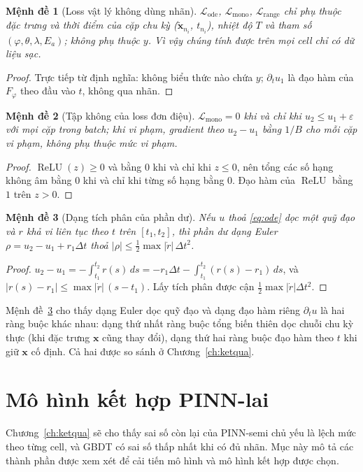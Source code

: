 \documentclass[12pt,a4paper,oneside]{report}
\theoremstyle{plain}
\newtheorem{menhde}{Mệnh đề}[chapter]
\theoremstyle{definition}
\begin{document}
\begin{menhde}[Loss vật lý không dùng nhãn]\label{md:labelfree}
$\mathcal{L}_\text{ode}$, $\mathcal{L}_\text{mono}$, $\mathcal{L}_\text{range}$ chỉ phụ thuộc đặc trưng và thời
điểm của cặp chu kỳ ($\tilde{\mathbf{x}}_{n_i}$, $t_{n_i}$), nhiệt độ $T$ và tham số
$(\varphi, \theta, \lambda, E_a)$; không phụ thuộc $y$. Vì vậy chúng tính được trên mọi cell chỉ có dữ liệu sạc.
\end{menhde}
\begin{proof}
Trực tiếp từ định nghĩa: không biểu thức nào chứa $y$; $\partial_t u_1$ là đạo hàm của $F_\varphi$ theo đầu vào
$t$, không qua nhãn.
\end{proof}

\begin{menhde}[Tập không của loss đơn điệu]\label{md:mono}
$\mathcal{L}_\text{mono} = 0$ khi và chỉ khi $u_2 \le u_1 + \varepsilon$ với mọi cặp trong batch; khi vi phạm,
gradient theo $u_2 - u_1$ bằng $1/B$ cho mỗi cặp vi phạm, không phụ thuộc mức vi phạm.
\end{menhde}
\begin{proof}
$\operatorname{ReLU}(z) \ge 0$ và bằng $0$ khi và chỉ khi $z \le 0$, nên tổng các số hạng không âm bằng $0$ khi
và chỉ khi từng số hạng bằng $0$. Đạo hàm của $\operatorname{ReLU}$ bằng $1$ trên $z > 0$.
\end{proof}

\begin{menhde}[Dạng tích phân của phần dư]\label{md:euler}
Nếu $u$ thoả \eqref{eq:ode} dọc một quỹ đạo và $r$ khả vi liên tục theo $t$ trên $[t_1, t_2]$, thì phần dư dạng
Euler $\rho = u_2 - u_1 + r_1\Delta t$ thoả $|\rho| \le \tfrac12 \max|\dot r|\,\Delta t^2$.
\end{menhde}
\begin{proof}
$u_2 - u_1 = -\int_{t_1}^{t_2} r(s)\,ds = -r_1\Delta t - \int_{t_1}^{t_2}(r(s) - r_1)\,ds$, và
$|r(s) - r_1| \le \max|\dot r|\,(s - t_1)$. Lấy tích phân được cận $\tfrac12\max|\dot r|\Delta t^2$.
\end{proof}

Mệnh đề~\ref{md:euler} cho thấy dạng Euler dọc quỹ đạo và dạng đạo hàm riêng $\partial_t u$ là hai ràng buộc
khác nhau: dạng thứ nhất ràng buộc tổng biến thiên dọc chuỗi chu kỳ thực (khi đặc trưng $\mathbf{x}$ cũng thay
đổi), dạng thứ hai ràng buộc đạo hàm theo $t$ khi giữ $\mathbf{x}$ cố định. Cả hai được so sánh ở
Chương~\ref{ch:ketqua}.

\section{Mô hình kết hợp PINN-lai}\label{sec:pinnlai_m}
Chương~\ref{ch:ketqua} sẽ cho thấy sai số còn lại của PINN-semi chủ yếu là lệch mức theo từng cell, và GBDT có sai số thấp nhất khi có đủ nhãn. Mục này mô tả các thành phần được xem xét để cải tiến mô hình và mô hình kết hợp được chọn.
\end{document}
